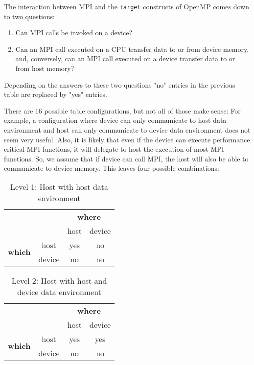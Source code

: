 The interaction between MPI and the \texttt{target} constructs of OpenMP comes 
down to two questions:
\begin{enumerate}
	\item 
	Can MPI calls be invoked on a device?
	\item 
	Can an MPI call executed on a CPU transfer data to or from device memory, 
	and, conversely, can an MPI call executed on a device transfer data to or 
	from host memory?
\end{enumerate}

Depending on the answers to these two questions  "no" entries in the previous 
table are replaced by "yes" entries.

There are 16 possible table configurations, but not all of those make sense:  
For example, a configuration where device can only communicate to host data 
environment and host can only communicate to device data environment does not 
seem very useful. 
Also, it is likely that even if the device can execute performance critical MPI 
functions, it will delegate to host the execution of most MPI functions. So, we 
assume that if device can call MPI, the host will also be able to communicate 
to device memory. This leaves four possible combinations:

\begin{table}[H]
\begin{tabular}{|c|c|c|c|}
	\cline{3-4}
	\multicolumn{2}{c|}{} & \multicolumn{2}{c|}{\textbf{where}} \\
	\cline{3-4}
	\multicolumn{2}{c|}{} & host & device \\
	\hline
	\multirow{2}{30 pt}{\textbf{which}} & host & yes & no \\
	\cline{2-4}
	& device & no & no \\
	\hline
	\end{tabular}
\caption*{Level 1: Host with host data environment}
\end{table}

\begin{table}[H]
\begin{tabular}{|c|c|c|c|}
	\cline{3-4}
	\multicolumn{2}{c|}{} & \multicolumn{2}{c|}{\textbf{where}} \\
	\cline{3-4}
	\multicolumn{2}{c|}{} & host & device \\
	\hline
	\multirow{2}{30 pt}{\textbf{which}} & host & yes & yes \\
	\cline{2-4}
	& device & no & no \\
	\hline
	\end{tabular}
	\caption*{Level 2: Host with host and device data environment}
\end{table}

